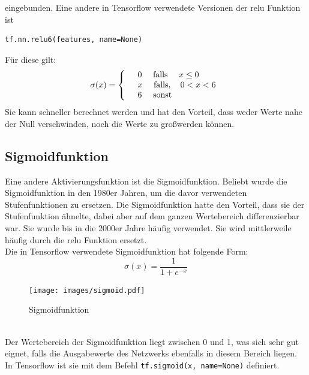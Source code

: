 eingebunden.
Eine andere in Tensorflow verwendete Versionen der relu Funktion ist \cite{cookbook}
\begin{lstlisting}
tf.nn.relu6(features, name=None)
\end{lstlisting}
F\"ur diese gilt:
\begin{align*}
	\sigma(x)=
	\left\{
	\begin{array}{l l}
		& 0 \quad \text{   falls  } \quad x \leq 0  \\ 
		& x \quad \text{   falls},\quad 0 < x < 6 \\
		& 6 \quad \text{   sonst}
	\end{array}
	\right.
\end{align*}
Sie kann schneller berechnet werden und hat den Vorteil, dass weder Werte nahe der Null verschwinden, noch die Werte zu gro\ss werden k\"onnen.\cite{cookbook} 
\subsection{Sigmoidfunktion}
Eine andere Aktivierungsfunktion ist die Sigmoidfunktion. Beliebt wurde die Sigmoidfunktion in den 1980er Jahren, um die davor verwendeten Stufenfunktionen zu ersetzen. Die Sigmoidfunktion hatte den Vorteil, dass sie der Stufenfunktion ähnelte, dabei aber auf dem ganzen Wertebereich differenzierbar war. Sie wurde bis in die 2000er Jahre häufig verwendet. Sie wird mittlerweile häufig durch die relu Funktion ersetzt. \cite{Goodfellow} \\
Die in Tensorflow verwendete Sigmoidfunktion hat folgende Form:\cite{cookbook}
\begin{equation}
\sigma(x)=\frac{1}{1+e^{-x}}
\end{equation}
\begin{figure}[!htp]
	\centering
	\texttt{[image: images/sigmoid.pdf]}
	\caption{Sigmoidfunktion \cite{building}}
\end{figure}\\
Der Wertebereich der Sigmoidfunktion liegt zwischen 0 und 1, was sich sehr gut eignet, falls die Ausgabewerte des Netzwerks ebenfalls in diesem Bereich liegen. In Tensorflow ist sie mit dem Befehl \lstinline$tf.sigmoid(x, name=None)$\cite{building}
definiert.
